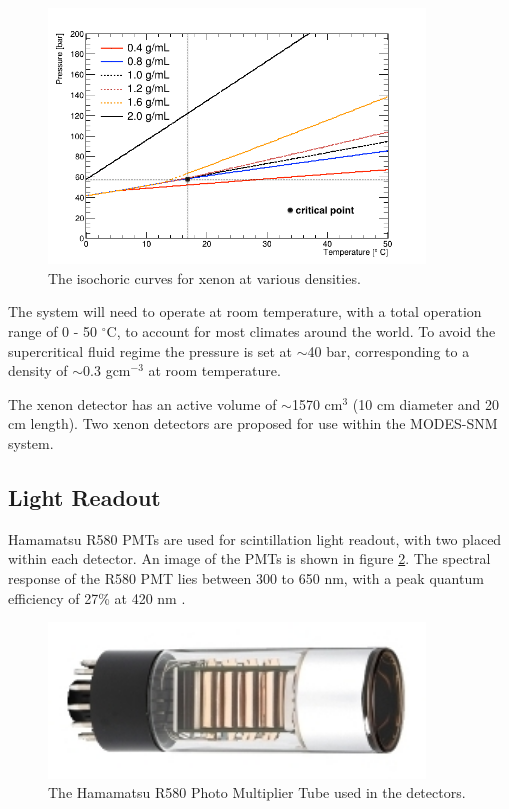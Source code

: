 \begin{figure}[htbp]
\begin{center}
\includegraphics[width=100mm]{Chapter5/figures/xenonIsochoricCurves.png}
\caption{The isochoric curves for xenon at various densities.}
\label{fig:xenonIsochoric}
\end{center}
\end{figure}

The system will need to operate at room temperature, with a total operation range of 0 - 50 $^{\circ}$C, to account for most climates around the world. To avoid the supercritical fluid regime the pressure is set at $\sim$40 bar, corresponding to a density of $\sim$0.3 gcm$^{-3}$ at room temperature. 

The xenon detector has an active volume of $\sim$1570 cm$^{3}$ (10 cm diameter and 20 cm length). Two xenon detectors are proposed for use within the MODES-SNM system.

\subsection{Light Readout}
Hamamatsu R580 PMTs are used for scintillation light readout, with two placed within each detector. An image of the PMTs is shown in figure \ref{fig:ModesPmt}. The spectral response of the R580 PMT lies between 300 to 650 nm, with a peak quantum efficiency of 27\% at 420 nm \cite{hamamatsuPMT}. 

\begin{figure}[htbp]
\begin{center}
\includegraphics[width=100mm]{Chapter5/figures/hamamatsuPMT.jpg}
\caption{The Hamamatsu R580 Photo Multiplier Tube used in the detectors.}
\label{fig:ModesPmt}
\end{center}
\end{figure}

